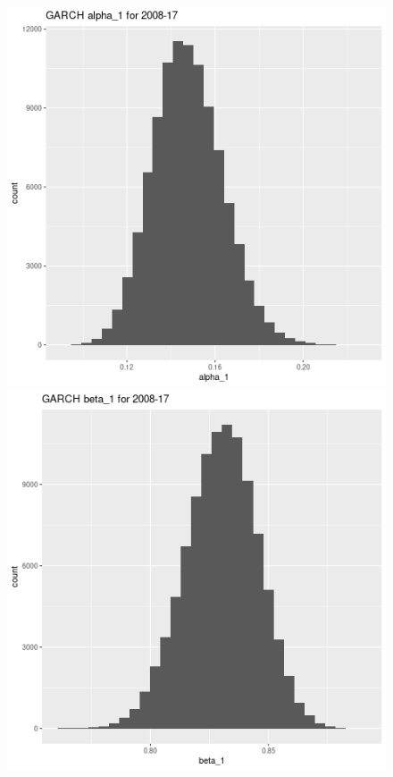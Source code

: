 \documentclass[12pt,letterpaper,reqno,fleqn]{article}
\begin{document}
\begin{figure}
\includegraphics[scale = .4]{ga10817}
\includegraphics[scale = .4]{gb10817}

\end{figure}
\end{document}

